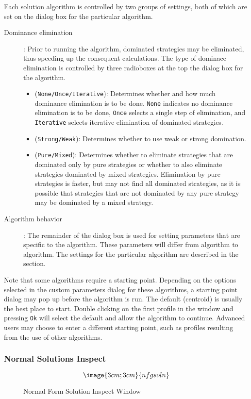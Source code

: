 {Each solution algorithm is controlled by two groups of settings, both of which are 
set on the dialog box for the particular algorithm.  
\begin{description}
\item[Dominance elimination]: Prior to running the algorithm, dominated strategies 
may be eliminated, thus speeding up the consequent calculations.  The type of 
dominace elimination is controlled by three radioboxes at the top the dialog 
box for the algorithm. 
\begin{itemize}
\item ({\tt None/Once/Iterative}):  Determines whether and how much dominance 
elimination is to be done.  {\tt None} indicates no dominance elimination is to 
be done,  {\tt Once} selects a single step of elimination,
and {\tt Iterative} selects iterative elimination of dominated strategies.  
\item ({\tt Strong/Weak}): Determines whether to use weak or strong domination.  
\item ({\tt Pure/Mixed}): Determines whether to eliminate strategies that are 
dominated only by pure strategies or whether to also eliminate strategies 
dominated by mixed strategies.  Elimination by pure strategies is faster, but may 
not find all dominated strategies, as it is possible that strategies that are 
not dominated by any pure strategy may be dominated by a mixed strategy.  
\end{itemize}
\item[Algorithm behavior]: The remainder of the dialog box is used for 
setting parameters that are specific to the algorithm.  These parameters will 
differ from algorithm to algorithm.  The settings for the particular algorithm are 
described in the  section.  
\end{description}

Note that some algorithms require a starting point.  Depending on the
options selected in the custom parameters dialog for these algorithms,
a starting point dialog may pop up before the algorithm is run.  The
default (centroid) is usually the best place to start.  Double clicking on
the first profile in the window and pressing {\tt Ok} will select the
default and allow the algorithm to continue. Advanced users may choose to
enter a different starting point, such as profiles resulting from the use of other 
algorithms.  

\subsubsection{Normal Solutions Inspect}\label{NormalSolutionInspect}
\begin{figure}
$$\image{3cm;3cm}{nfgsoln}$$
\caption{Normal Form Solution Inspect Window}\label{fig_nfgsoln}
\end{figure}

}
